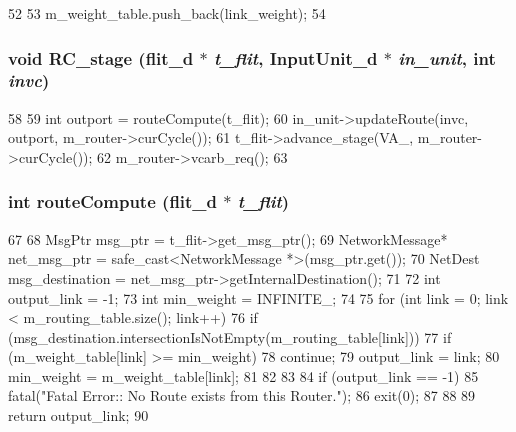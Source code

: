 \begin{DoxyCode}
52 {
53     m_weight_table.push_back(link_weight);
54 }
\end{DoxyCode}
\hypertarget{classRoutingUnit__d_a536a9cac40c36ea5c44a8bdc4e5db567}{
\subsubsection[{RC\_\-stage}]{\setlength{\rightskip}{0pt plus 5cm}void RC\_\-stage ({\bf flit\_\-d} $\ast$ {\em t\_\-flit}, \/  {\bf InputUnit\_\-d} $\ast$ {\em in\_\-unit}, \/  int {\em invc})}}
\label{classRoutingUnit__d_a536a9cac40c36ea5c44a8bdc4e5db567}



\begin{DoxyCode}
58 {
59     int outport = routeCompute(t_flit);
60     in_unit->updateRoute(invc, outport, m_router->curCycle());
61     t_flit->advance_stage(VA_, m_router->curCycle());
62     m_router->vcarb_req();
63 }
\end{DoxyCode}
\hypertarget{classRoutingUnit__d_ab4ebc8d14fb6a01d9c0e86c021aded35}{
\subsubsection[{routeCompute}]{\setlength{\rightskip}{0pt plus 5cm}int routeCompute ({\bf flit\_\-d} $\ast$ {\em t\_\-flit})}}
\label{classRoutingUnit__d_ab4ebc8d14fb6a01d9c0e86c021aded35}



\begin{DoxyCode}
67 {
68     MsgPtr msg_ptr = t_flit->get_msg_ptr();
69     NetworkMessage* net_msg_ptr = safe_cast<NetworkMessage *>(msg_ptr.get());
70     NetDest msg_destination = net_msg_ptr->getInternalDestination();
71 
72     int output_link = -1;
73     int min_weight = INFINITE_;
74 
75     for (int link = 0; link < m_routing_table.size(); link++) {
76         if (msg_destination.intersectionIsNotEmpty(m_routing_table[link])) {
77             if (m_weight_table[link] >= min_weight)
78                 continue;
79             output_link = link;
80             min_weight = m_weight_table[link];
81         }
82     }
83 
84     if (output_link == -1) {
85         fatal("Fatal Error:: No Route exists from this Router.");
86         exit(0);
87     }
88 
89     return output_link;
90 }
\end{DoxyCode}



